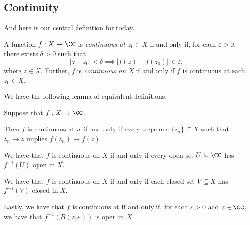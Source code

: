 \subsection{Continuity}
And here is our central definition for today.
\begin{definition}[Continuous]
	A function $f:X\to\CC$ is \textit{continuous at $z_0\in X$} if and only if, for each $\varepsilon>0$, there exists $\delta>0$ such that
	\[|z-z_0|<\delta\implies|f(z)-f(z_0)|<\varepsilon,\]
	where $z\in X$. Further, $f$ is \textit{continuous on $X$} if and only if $f$ is continuous at each $z_0\in X$.
\end{definition}
We have the following lemma of equivalent definitions.
\begin{lemma} \label{lem:topologicalcontinuity}
	Suppose that $f:X\to\CC$.
	\begin{listalph}
		\item Then $f$ is continuous at $w$ if and only if every sequence $\{z_n\}\subseteq X$ such that $z_n\to z$ implies $f(z_n)\to f(z)$.
		\item We have that $f$ is continuous on $X$ if and only if every open set $U\subseteq\CC$ has $f^{-1}(U)$ open in $X$.
		\item We have that $f$ is continuous on $X$ if and only if each closed set $V\subseteq X$ has $f^{-1}(V)$ closed in $X$.
		\item Lastly, we have that $f$ is continuous at if and only if, for each $\varepsilon>0$ and $z\in\CC$, we have that $f^{-1}(B(z,\varepsilon))$ is open in $X$.
	\end{listalph}
\end{lemma}
